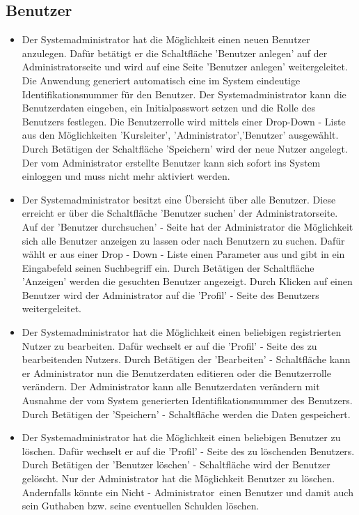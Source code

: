 \documentclass[a4paper]{scrreprt}
\begin{document}
	\subsection{Benutzer}
			\begin{itemize}
				\item {}
					Der Systemadministrator hat die Möglichkeit einen neuen Benutzer anzulegen. Dafür betätigt er die Schaltfläche 'Benutzer anlegen' auf der Administratorseite und wird auf eine Seite 'Benutzer anlegen' weitergeleitet. 
					Die Anwendung generiert automatisch eine im System eindeutige Identifikationsnummer für den Benutzer. Der Systemadministrator kann die Benutzerdaten eingeben, ein Initialpasswort setzen und die Rolle des Benutzers festlegen. Die Benutzerrolle wird mittels einer Drop-Down - Liste aus den Möglichkeiten 'Kursleiter', 'Administrator','Benutzer' ausgewählt. Durch Betätigen der Schaltfläche 'Speichern' wird der neue Nutzer angelegt. Der vom Administrator erstellte Benutzer kann sich sofort ins System einloggen und muss nicht mehr aktiviert werden.
				\item {}
					Der Systemadministrator besitzt eine Übersicht über alle Benutzer. Diese erreicht er über die Schaltfläche 'Benutzer suchen' der Administratorseite. Auf der 'Benutzer durchsuchen' - Seite hat der Administrator die Möglichkeit sich alle Benutzer anzeigen zu lassen oder nach Benutzern zu suchen.  Dafür wählt er aus einer Drop - Down - Liste einen Parameter aus und gibt in ein Eingabefeld seinen Suchbegriff ein. Durch Betätigen der Schaltfläche 'Anzeigen' werden die gesuchten Benutzer angezeigt. Durch Klicken auf einen Benutzer wird der Administrator auf die 'Profil' - Seite des Benutzers weitergeleitet.
				\item {}
					Der Systemadministrator hat die Möglichkeit einen beliebigen registrierten Nutzer zu bearbeiten. Dafür wechselt er auf die 'Profil' - Seite des zu bearbeitenden Nutzers. Durch Betätigen der 'Bearbeiten' - Schaltfläche kann er Administrator nun die Benutzerdaten editieren oder die Benutzerrolle verändern. Der Administrator kann alle Benutzerdaten verändern mit Ausnahme der vom System generierten Identifikationsnummer des Benutzers. Durch Betätigen der 'Speichern' - Schaltfläche werden die Daten gespeichert.
				\item {}
					Der Systemadministrator hat die Möglichkeit einen beliebigen Benutzer zu löschen. Dafür wechselt er auf die 'Profil' - Seite des zu löschenden Benutzers. Durch Betätigen der 'Benutzer löschen' - Schaltfläche wird der Benutzer gelöscht. Nur der Administrator hat die Möglichkeit Benutzer zu löschen. Andernfalls könnte ein \glqq Nicht - Administrator\grqq \ einen Benutzer und damit auch sein Guthaben bzw. seine eventuellen Schulden löschen.

\end{itemize}
\end{document}
